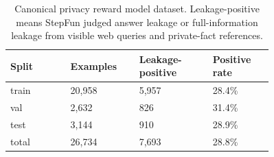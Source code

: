 \begin{table}[t]
\centering
\small
\begin{tabular}{p{0.18\linewidth}p{0.18\linewidth}p{0.22\linewidth}p{0.18\linewidth}}
\toprule
\textbf{Split} & \textbf{Examples} & \textbf{Leakage-positive} & \textbf{Positive rate} \\
\midrule
train & 20,958 & 5,957 & 28.4\% \\
val & 2,632 & 826 & 31.4\% \\
test & 3,144 & 910 & 28.9\% \\
total & 26,734 & 7,693 & 28.8\% \\
\bottomrule
\end{tabular}
\caption{Canonical privacy reward model dataset. Leakage-positive means StepFun judged answer leakage or full-information leakage from visible web queries and private-fact references.}
\label{tab:privacy_reward_dataset_summary}
\end{table}
